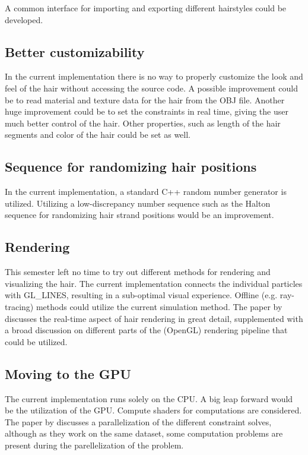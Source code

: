 \documentclass[sigplan,screen,nonacm]{acmart}
\begin{document}
A common interface for importing and exporting different hairstyles could be
developed.

\subsection{Better customizability}
In the current implementation there is no way to properly customize the look and
feel of the hair without accessing the source code. A possible improvement could
be to read material and texture data for the hair from the OBJ file. Another
huge improvement could be to set the constraints in real time, giving the user
much better control of the hair. Other properties, such as length of the hair
segments and color of the hair could be set as well.

\subsection{Sequence for randomizing hair positions}
\label{section:futureHalton}
In the current implementation, a standard C++ random number generator is
utilized. Utilizing a low-discrepancy number sequence such as the Halton
sequence for randomizing hair strand positions would be an improvement.

\subsection{Rendering}
This semester left no time to try out different methods for rendering and
visualizing the hair. The current implementation connects the individual
particles with GL\_LINES, resulting in a sub-optimal visual experience. Offline
(e.g. ray-tracing) methods could utilize the current simulation method. 
The paper by \citet{RappRealTime} discusses the real-time aspect of hair
rendering in great detail, supplemented with a broad discussion on different
parts of the (OpenGL) rendering pipeline that could be utilized.

\subsection{Moving to the GPU}
The current implementation runs solely on the CPU. A big leap forward would be
the utilization of the GPU. Compute shaders for computations are considered. The
paper by \citet{UmenhofferSimulation} discusses a parallelization of the
different constraint solves, although as they work on the same dataset, some
computation problems are present during the parellelization of the
problem.
\end{document}
